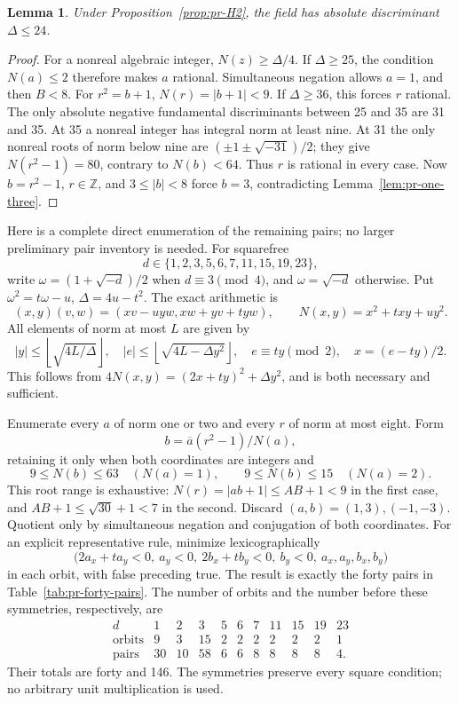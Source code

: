\documentclass[12pt]{article}
\newtheorem{lemma}[theorem]{Lemma}
\numberwithin{equation}{section}
\begin{document}
\begin{lemma}\label{lem:pr-field24}
Under Proposition~\ref{prop:pr-H2}, the field has absolute discriminant
\(\Delta\le24\).
\end{lemma}
\begin{proof}
For a nonreal algebraic integer, \(N(z)\ge\Delta/4\).
If \(\Delta\ge25\), the condition \(N(a)\le2\) therefore makes
\(a\) rational. Simultaneous negation allows \(a=1\), and then
\(B<8\). For \(r^2=b+1\),
\(N(r)=|b+1|<9\). If \(\Delta\ge36\), this forces \(r\) rational.
The only absolute negative fundamental discriminants between 25 and 35
are 31 and 35. At 35 a nonreal integer has integral norm at least nine.
At 31 the only nonreal roots of norm below nine are
\((\pm1\pm\sqrt{-31})/2\); they give \(N(r^2-1)=80\), contrary to
\(N(b)<64\). Thus \(r\) is rational in every case. Now
\(b=r^2-1\), \(r\in\mathbb Z\), and \(3\le|b|<8\) force \(b=3\),
contradicting Lemma~\ref{lem:pr-one-three}.
\end{proof}

Here is a complete direct enumeration of the remaining pairs; no
larger preliminary pair inventory is needed. For squarefree
\[
 d\in\{1,2,3,5,6,7,11,15,19,23\},
\]
write \(\omega=(1+\sqrt{-d})/2\) when \(d\equiv3\pmod4\), and
\(\omega=\sqrt{-d}\) otherwise. Put
\(\omega^2=t\omega-u\), \(\Delta=4u-t^2\). The exact arithmetic is
\begin{equation}\label{eq:pr-ring-arithmetic}
 (x,y)(v,w)=(xv-uyw,xw+yv+tyw),\qquad
 N(x,y)=x^2+txy+uy^2.
\end{equation}
All elements of norm at most \(L\) are given by
\begin{equation}\label{eq:pr-disk}
 |y|\le\left\lfloor\sqrt{4L/\Delta}\right\rfloor,\quad
 |e|\le\left\lfloor\sqrt{4L-\Delta y^2}\right\rfloor,\quad
 e\equiv ty\pmod2,\quad x=(e-ty)/2.
\end{equation}
This follows from \(4N(x,y)=(2x+ty)^2+\Delta y^2\), and is both
necessary and sufficient.

Enumerate every \(a\) of norm one or two and every \(r\) of norm at
most eight. Form
\[
 b=\overline a(r^2-1)/N(a),
\]
retaining it only when both coordinates are integers and
\[
 9\le N(b)\le63\quad(N(a)=1),\qquad
 9\le N(b)\le15\quad(N(a)=2).
\]
This root range is exhaustive: \(N(r)=|ab+1|\le AB+1<9\) in the
first case, and \(AB+1\le\sqrt{30}+1<7\) in the second.
Discard \((a,b)=(1,3),(-1,-3)\). Quotient only by simultaneous
negation and conjugation of both coordinates. For an explicit
representative rule, minimize lexicographically
\[
 \bigl(2a_x+ta_y<0,\ a_y<0,\ 2b_x+tb_y<0,\ b_y<0,\ a_x,a_y,b_x,b_y\bigr)
\]
in each orbit, with false preceding true. The result is exactly the
forty pairs in Table~\ref{tab:pr-forty-pairs}. The number of orbits
and the number before these symmetries, respectively, are
\[
\begin{array}{c|rrrrrrrrrr}
 d&1&2&3&5&6&7&11&15&19&23\\\hline
 \text{orbits}&9&3&15&2&2&2&2&2&2&1\\
 \text{pairs}&30&10&58&6&6&8&8&8&8&4.
\end{array}
\]
Their totals are forty and 146. The symmetries preserve every square
condition; no arbitrary unit multiplication is used.
\end{document}

